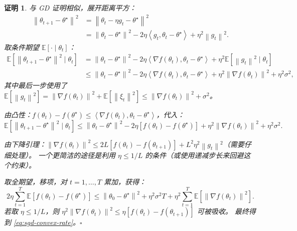 \documentclass[12pt,a4paper]{ctexart}
\theoremstyle{definition}
\theoremstyle{plain}
\newtheorem*{proof*}{证明}
\newcommand{\E}{\mathbb{E}}
\newcommand{\grad}{\nabla}
\newcommand{\norm}[1]{\left\lVert #1 \right\rVert}
\newcommand{\ip}[2]{\left\langle #1,#2 \right\rangle}
\begin{document}
\begin{proof*}
  与 GD 证明相似，展开距离平方：
  \begin{equation}
    \begin{aligned}
      \norm{\theta_{t+1} - \theta^\star}^2
      &= \norm{\theta_t - \eta g_t - \theta^\star}^2 \\
      &= \norm{\theta_t - \theta^\star}^2
        - 2\eta \ip{g_t}{\theta_t - \theta^\star}
        + \eta^2 \norm{g_t}^2.
    \end{aligned}
  \end{equation}
  取条件期望 $\E[\cdot \mid \theta_t]$：
  \begin{equation}
    \begin{aligned}
      \E[\norm{\theta_{t+1} - \theta^\star}^2 \mid \theta_t]
      &= \norm{\theta_t - \theta^\star}^2
        - 2\eta \ip{\grad f(\theta_t)}{\theta_t - \theta^\star}
        + \eta^2 \E[\norm{g_t}^2 \mid \theta_t] \\[4pt]
      &\le \norm{\theta_t - \theta^\star}^2
        - 2\eta \ip{\grad f(\theta_t)}{\theta_t - \theta^\star}
        + \eta^2 \norm{\grad f(\theta_t)}^2 + \eta^2 \sigma^2,
    \end{aligned}
  \end{equation}
  其中最后一步使用了 $\E[\norm{g_t}^2] = \norm{\grad f(\theta_t)}^2 + \E[\norm{\xi_t}^2] \le \norm{\grad f(\theta_t)}^2 + \sigma^2$。

  由凸性：$f(\theta_t) - f(\theta^\star) \le \ip{\grad f(\theta_t)}{\theta_t - \theta^\star}$，代入：
  \begin{equation}
    \E[\norm{\theta_{t+1} - \theta^\star}^2 \mid \theta_t]
    \le \norm{\theta_t - \theta^\star}^2
      - 2\eta [f(\theta_t) - f(\theta^\star)]
      + \eta^2 \norm{\grad f(\theta_t)}^2 + \eta^2 \sigma^2.
  \end{equation}

  由下降引理：$\norm{\grad f(\theta_t)}^2 \le 2L[f(\theta_t) - f(\theta_{t+1})] + L^2\eta^2 \norm{g_t}^2$（需要仔细处理）。
  一个更简洁的途径是利用 $\eta \le 1/L$ 的条件（或使用递减步长来回避这个约束）。

  取全期望，移项，对 $t = 1, \ldots, T$ 累加，获得：
  \begin{equation}
    2\eta \sum_{t=1}^T \E[f(\theta_t) - f(\theta^\star)]
    \le \norm{\theta_0 - \theta^\star}^2 + \eta^2 \sigma^2 T + \eta^2 \sum_{t=1}^T \E[\norm{\grad f(\theta_t)}^2].
  \end{equation}
  若取 $\eta \le 1/L$，则 $\eta^2 \norm{\grad f(\theta_t)}^2 \le \eta [f(\theta_t) - f(\theta_{t+1})]$ 可被吸收。
  最终得到 \eqref{eq:sgd-convex-rate}。$\square$
\end{proof*}
\end{document}
